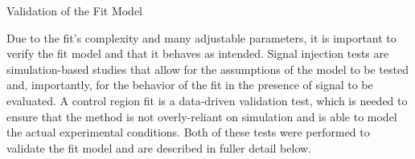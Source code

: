 \begin{section}{Validation of the Fit Model}

Due to the fit's complexity and many adjustable parameters, it is important to verify the fit model and that it behaves as intended.
Signal injection tests are simulation-based studies that allow for the assumptions of the model to be tested and, importantly, for the behavior of the fit in the presence of signal to be evaluated.
A control region fit is a data-driven validation test, which is needed to ensure that the method is not overly-reliant on simulation and is able to model the actual experimental conditions.
Both of these tests were performed to validate the fit model and are described in fuller detail below.

\end{section}


